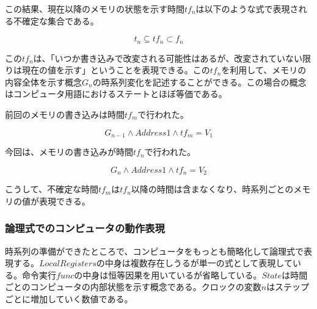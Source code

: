 \documentclass[12pt]{article}
\begin{document}
この結果、現在以降のメモリの状態を示す時間\(tf_n\)は以下のような式で表現される不確定な集合である。

\begin{equation} t_{n} \subseteq tf_n \subset f_{n}\end{equation}

この\(tf_n\)は、「いつか書き込みで改変される可能性はあるが、改変されていない限りは現在の値を示す」ということを表現できる。この\(tf_n\)を利用して、メモリの内容全体を示す概念\(G_n\)の時系列変化を記述することができる。この場合の概念はコンピュータ用語におけるステートとほぼ等価である。

前回のメモリの書き込みは時間\(tf_m\)で行われた。

\begin{equation} G_{n-1} \wedge Address1 \wedge tf_m = V_1\end{equation}

今回は、メモリの書き込みが時間\(tf_n\)で行われた。

\begin{equation} G_{n} \wedge Address1 \wedge tf_n = V_2\end{equation}

こうして、不確定な時間\(tf_m\)は\(tf_n\)以降の時間は含まなくなり、時系列ごとのメモリの値が表現できる。

\subsubsection{論理式でのコンピュータの動作表現}\label{ux8ad6ux7406ux5f0fux3067ux306eux30b3ux30f3ux30d4ux30e5ux30fcux30bfux306eux52d5ux4f5cux8868ux73fe}

時系列の準備ができたところで、コンピュータをもっとも簡略化して論理式で表現する。\(LocalRegisters\)の中身は複数存在しうるが単一の式として表現している。命令実行\(func\)の中身は恒等因果を用いているが省略している。\(State\)は時間ごとのコンピュータの内部状態を示す概念である。クロックの変数\(n\)はステップごとに増加していく数値である。
\end{document}

